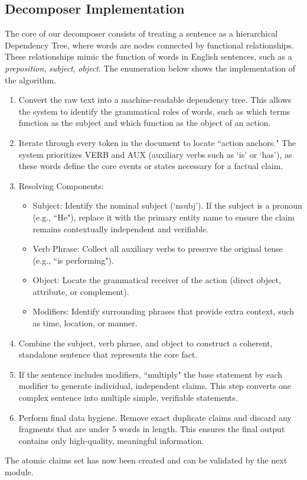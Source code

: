 \subsection{Decomposer Implementation}
The core of our decomposer consists of treating a sentence as a hierarchical Dependency Tree, where words are nodes connected by functional relationships. These relationships mimic the function of words in English sentences, such as a \textit{preposition}, \textit{subject}, \textit{object}. The enumeration below shows the implementation of the algorithm. 
\begin{enumerate}
    \item Convert the raw text into a machine-readable dependency tree. This allows the system to identify the grammatical roles of words, such as which terms function as the subject and which function as the object of an action.
    \item Iterate through every token in the document to locate ``action anchors." The system prioritizes VERB and AUX (auxiliary verbs such as `is' or `has'), as these words define the core events or states necessary for a factual claim.
    \item Resolving Components: 
    \begin{itemize}
        \item Subject: Identify the nominal subject (`nsubj'). If the subject is a pronoun (e.g., ``He"), replace it with the primary entity name to ensure the claim remains contextually independent and verifiable.
        \item Verb Phrase: Collect all auxiliary verbs to preserve the original tense (e.g., ``is performing").
        \item Object: Locate the grammatical receiver of the action (direct object, attribute, or complement).
        \item Modifiers: Identify surrounding phrases that provide extra context, such as time, location, or manner.
    \end{itemize}
    \item  Combine the subject, verb phrase, and object to construct a coherent, standalone sentence that represents the core fact.
    \item If the sentence includes modifiers, ``multiply" the base statement by each modifier to generate individual, independent claims. This step converts one complex sentence into multiple simple, verifiable statements.
    \item  Perform final data hygiene. Remove exact duplicate claims and discard any fragments that are under 5 words in length. This ensures the final output contains only high-quality, meaningful information.
\end{enumerate}
The atomic claims set has now been created and can be validated by the next module. 

